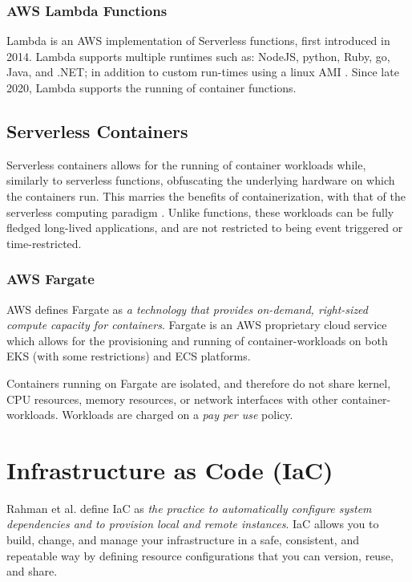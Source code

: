 \subsection{AWS Lambda Functions}
Lambda\cite{musgrave_2022} is an AWS implementation of Serverless functions, first introduced in 2014\cite{handy_2014}.
Lambda supports multiple runtimes such as: NodeJS, python, Ruby, go, Java, and .NET; in addition to custom run-times using a linux AMI \cite{musgrave_2022_runtimes}.
Since late 2020, Lambda supports the running of container functions\cite{lambda}.

\section{Serverless Containers}
Serverless containers allows for the running of container workloads while, similarly to serverless functions, obfuscating the underlying hardware on which the containers run. 
This marries the benefits of containerization, with that of the serverless computing paradigm \cite{PEREZ201850}. 
Unlike functions, these workloads can be fully fledged long-lived applications, and are not restricted to being event triggered or time-restricted.

\subsection{AWS Fargate}
AWS defines Fargate as \emph{a technology that provides on-demand, right-sized compute capacity for containers}\cite{hansen_2022_fargate}. 
Fargate is an AWS proprietary cloud service which allows for the provisioning and running of container-workloads on both EKS (with some restrictions) and ECS platforms. 

Containers running on Fargate are isolated, and therefore do not share kernel, CPU resources, memory resources, or network interfaces with other container-workloads.
Workloads are charged on a \textit{pay per use} policy.

\chapter{Infrastructure as Code (IaC)}
Rahman et al. define IaC as \emph{the practice to automatically configure system dependencies and to provision local and remote instances}\cite{RAHMAN201965}.
IaC allows you to build, change, and manage your infrastructure in a safe, consistent, and repeatable way by defining resource configurations that you can version, reuse, and share\cite{hashicorp_tf_iac}.

